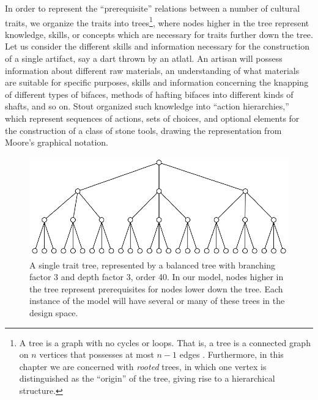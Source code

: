 In order to represent the ``prerequisite'' relations between a number of
cultural traits, we organize the traits into trees\footnote{A tree is a
  graph with no cycles or loops. That is, a tree is a connected graph on
  $n$ vertices that possesses at most $n-1$ edges
  \citep{diestel2010graph}. Furthermore, in this chapter we are
  concerned with \emph{rooted} trees, in which one vertex is
  distinguished as the ``origin'' of the tree, giving rise to a
  hierarchical structure.}, where nodes higher in the tree represent
knowledge, skills, or concepts which are necessary for traits further
down the tree. Let us consider the different skills and information
necessary for the construction of a single artifact, say a dart thrown
by an atlatl. An artisan will possess information about different raw
materials, an understanding of what materials are suitable for specific
purposes, skills and information concerning the knapping of different
types of bifaces, methods of hafting bifaces into different kinds of
shafts, and so on. Stout \citeyearpar{stout2011stone} organized such
knowledge into ``action hierarchies,'' which represent sequences of
actions, sets of choices, and optional elements for the construction of
a class of stone tools, drawing the representation from Moore's
\citeyearpar{moore2010grammars} graphical notation.

\begin{figure}[h] 
\centering 
\includegraphics[]{graphics/semanticaxelrod/balanced-trait-tree-3-3.eps} 
\caption{A single trait tree, represented by a balanced tree with branching factor 3 and depth factor 3, order 40.  In our model, nodes higher in the tree represent prerequisites for nodes lower down the tree.  Each instance of the model will have several or many of these trees in the design space.} 
\label{img:trait-tree} 
\end{figure}

